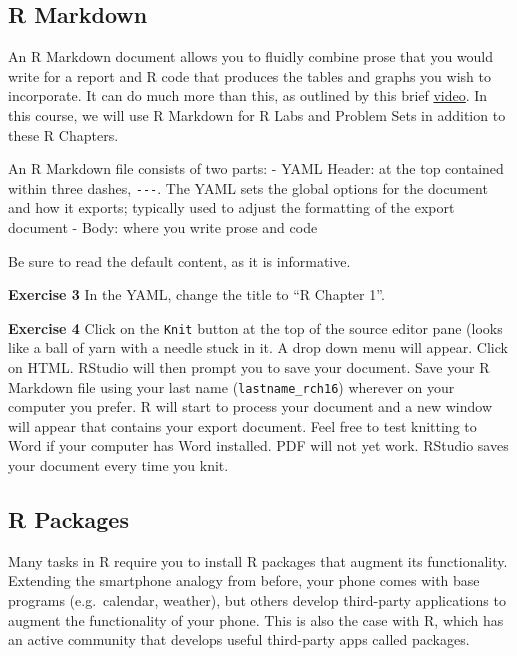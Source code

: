 \documentclass[
]{book}
\newenvironment{rmdblock}[1]
  {\begin{shaded*}
  }
  {\end{shaded*}
  }
\newenvironment{learncheck}
  {\begin{rmdblock}{warning}}
  {\end{rmdblock}}
\begin{document}
\hypertarget{r-markdown}{%
\subsection{R Markdown}\label{r-markdown}}

An R Markdown document allows you to fluidly combine prose that you would write for a report and R code that produces the tables and graphs you wish to incorporate. It can do much more than this, as outlined by this brief \href{https://rmarkdown.rstudio.com/lesson-1.html}{video}. In this course, we will use R Markdown for R Labs and Problem Sets in addition to these R Chapters.

An R Markdown file consists of two parts:
- YAML Header: at the top contained within three dashes, \texttt{-\/-\/-}. The YAML sets the global options for the document and how it exports; typically used to adjust the formatting of the export document
- Body: where you write prose and code

Be sure to read the default content, as it is informative.

\begin{learncheck}
\textbf{Exercise 3} In the YAML, change the title to ``R Chapter 1''.
\end{learncheck}

\begin{learncheck}
\textbf{Exercise 4} Click on the \texttt{Knit} button at the top of the
source editor pane (looks like a ball of yarn with a needle stuck in it.
A drop down menu will appear. Click on HTML. RStudio will then prompt
you to save your document. Save your R Markdown file using your last
name (\texttt{lastname\_rch16}) wherever on your computer you prefer. R
will start to process your document and a new window will appear that
contains your export document. Feel free to test knitting to Word if
your computer has Word installed. PDF will not yet work. RStudio saves
your document every time you knit.
\end{learncheck}

\hypertarget{r-packages}{%
\subsection{R Packages}\label{r-packages}}

Many tasks in R require you to install R packages that augment its functionality. Extending the smartphone analogy from before, your phone comes with base programs (e.g.~calendar, weather), but others develop third-party applications to augment the functionality of your phone. This is also the case with R, which has an active community that develops useful third-party apps called packages.
\end{document}
